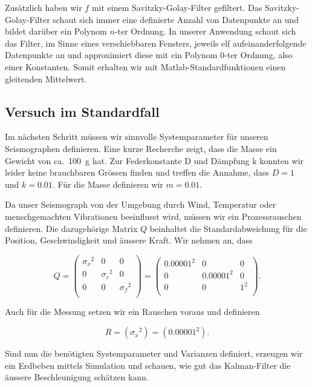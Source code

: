 Zusätzlich haben wir $f$ mit einem Savitzky-Golay-Filter gefiltert.
Das Savitzky-Golay-Filter schaut sich immer eine definierte Anzahl von Datenpunkte an
und bildet  darüber ein Polynom $n$-ter Ordnung.
In unserer Anwendung schaut sich das Filter, im Sinne eines verschiebbaren Fensters,
jeweils elf aufeinanderfolgende Datenpunkte an
und approximiert diese mit ein Polynom $0$-ter Ordnung,
also einer Konstanten.
Somit erhalten wir mit Matlab-Standardfunktionen einen gleitenden Mittelwert.

\subsection{Versuch im Standardfall}
Im nächsten Schritt müssen wir sinnvolle Systemparameter für unseren Seismographen definieren.
Eine kurze Recherche zeigt, dass die Masse ein Gewicht von ca.\ \SI{100}{\gram} hat.
Zur Federkonstante D und Dämpfung k konnten wir leider keine brauchbaren Grössen finden und treffen die Annahme, dass $D = 1$ und $k = 0.01$.
Für die Masse definieren wir $m = 0.01$.

Da unser Seismograph von der Umgebung durch Wind, Temperatur oder menschgemachten Vibrationen beeinflusst wird, müssen wir ein Prozessrauschen definieren.
Die dazugehörige Matrix $Q$ beinhaltet die Standardabweichung für die Position, Geschwindigkeit und äussere Kraft.
Wir nehmen an, dass

\begin{equation}
	Q = \left(
	\begin{array}{ccc}
		{\sigma_x }^2& 0& 0 \\
		0 & {\sigma_v }^2& 0\\
		0 & 0& {\sigma_f }^2\\
	\end{array}\right)= \left(
	\begin{array}{ccc}
		{0.00001}^2& 0& 0 \\
		0 & {0.00001}^2& 0\\
		0 & 0& {1 }^2\\
	\end{array}\right).
\end{equation}

Auch für die Messung setzen wir ein Rauschen voraus und definieren

\begin{equation}
R= ({\sigma_x}^2)=
({0.00001}^2).
\end{equation}

Sind nun die benötigten Systemparameter und Varianzen definiert,
erzeugen wir ein Erdbeben mittels Simulation und schauen,
wie gut das Kalman-Filter die äussere Beschleunigung schätzen kann.


